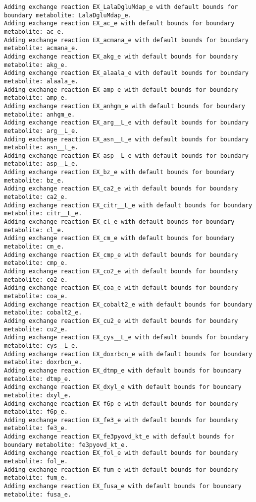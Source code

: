 \documentclass[
  letterpaper,
  DIV=11,
  numbers=noendperiod]{scrartcl}
\begin{document}
\begin{verbatim}
Adding exchange reaction EX_LalaDgluMdap_e with default bounds for boundary metabolite: LalaDgluMdap_e.
Adding exchange reaction EX_ac_e with default bounds for boundary metabolite: ac_e.
Adding exchange reaction EX_acmana_e with default bounds for boundary metabolite: acmana_e.
Adding exchange reaction EX_akg_e with default bounds for boundary metabolite: akg_e.
Adding exchange reaction EX_alaala_e with default bounds for boundary metabolite: alaala_e.
Adding exchange reaction EX_amp_e with default bounds for boundary metabolite: amp_e.
Adding exchange reaction EX_anhgm_e with default bounds for boundary metabolite: anhgm_e.
Adding exchange reaction EX_arg__L_e with default bounds for boundary metabolite: arg__L_e.
Adding exchange reaction EX_asn__L_e with default bounds for boundary metabolite: asn__L_e.
Adding exchange reaction EX_asp__L_e with default bounds for boundary metabolite: asp__L_e.
Adding exchange reaction EX_bz_e with default bounds for boundary metabolite: bz_e.
Adding exchange reaction EX_ca2_e with default bounds for boundary metabolite: ca2_e.
Adding exchange reaction EX_citr__L_e with default bounds for boundary metabolite: citr__L_e.
Adding exchange reaction EX_cl_e with default bounds for boundary metabolite: cl_e.
Adding exchange reaction EX_cm_e with default bounds for boundary metabolite: cm_e.
Adding exchange reaction EX_cmp_e with default bounds for boundary metabolite: cmp_e.
Adding exchange reaction EX_co2_e with default bounds for boundary metabolite: co2_e.
Adding exchange reaction EX_coa_e with default bounds for boundary metabolite: coa_e.
Adding exchange reaction EX_cobalt2_e with default bounds for boundary metabolite: cobalt2_e.
Adding exchange reaction EX_cu2_e with default bounds for boundary metabolite: cu2_e.
Adding exchange reaction EX_cys__L_e with default bounds for boundary metabolite: cys__L_e.
Adding exchange reaction EX_doxrbcn_e with default bounds for boundary metabolite: doxrbcn_e.
Adding exchange reaction EX_dtmp_e with default bounds for boundary metabolite: dtmp_e.
Adding exchange reaction EX_dxyl_e with default bounds for boundary metabolite: dxyl_e.
Adding exchange reaction EX_f6p_e with default bounds for boundary metabolite: f6p_e.
Adding exchange reaction EX_fe3_e with default bounds for boundary metabolite: fe3_e.
Adding exchange reaction EX_fe3pyovd_kt_e with default bounds for boundary metabolite: fe3pyovd_kt_e.
Adding exchange reaction EX_fol_e with default bounds for boundary metabolite: fol_e.
Adding exchange reaction EX_fum_e with default bounds for boundary metabolite: fum_e.
Adding exchange reaction EX_fusa_e with default bounds for boundary metabolite: fusa_e.

\end{verbatim}
\end{document}
